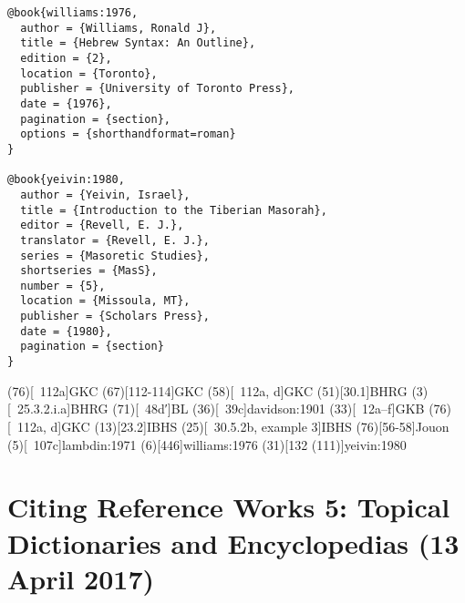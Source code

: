 \documentclass[a4paper]{article}
\begin{document}
\begin{verbatim}
@book{williams:1976,
  author = {Williams, Ronald J},
  title = {Hebrew Syntax: An Outline},
  edition = {2},
  location = {Toronto},
  publisher = {University of Toronto Press},
  date = {1976},
  pagination = {section},
  options = {shorthandformat=roman}
}

@book{yeivin:1980,
  author = {Yeivin, Israel},
  title = {Introduction to the Tiberian Masorah},
  editor = {Revell, E. J.},
  translator = {Revell, E. J.},
  series = {Masoretic Studies},
  shortseries = {MasS},
  number = {5},
  location = {Missoula, MT},
  publisher = {Scholars Press},
  date = {1980},
  pagination = {section}
}
\end{verbatim}

\examplecite(76)[\pno 112a]{GKC}
\examplecite(67)[112-114]{GKC}
\examplecite(58)[\pno 112a, d]{GKC}
\examplecite(51)[30.1]{BHRG}
\examplecite(3)[\pno 25.3.2.i.a]{BHRG}
\examplecite(71)[\pno 48d′]{BL}
\examplecite(36)[\pno 39c]{davidson:1901}
\examplecite(33)[\pno 12a--f]{GKB}
\examplecite(76)[\pno 112a, d]{GKC}
\examplecite(13)[23.2]{IBHS}
\examplecite(25)[\pno 30.5.2b, example 3]{IBHS}
\examplecite(76)[56-58]{Jouon}
\examplecite(5)[\pno 107c]{lambdin:1971}
\examplecite(6)[446]{williams:1976}
\examplecite(31)[132 \mkbibparens{111}]{yeivin:1980}
\exampleabbreviations
\examplebibliography
{}

\section{Citing Reference Works 5: Topical Dictionaries and Encyclopedias (13 April 2017)}
\end{document}
